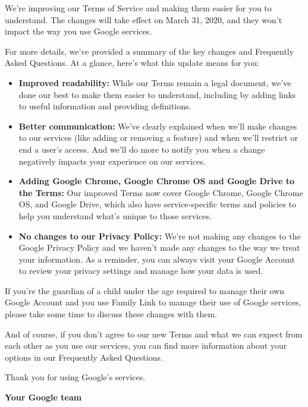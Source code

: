 \documentclass[12pt]{sigbovik-review}
\author{\textless noreply-utos@google.com\textgreater}
\begin{document}
\maketitle

We’re improving our Terms of Service and making them easier for you to
understand. The changes will take effect on March 31, 2020, and they won’t
impact the way you use Google services.

For more details, we’ve provided a summary of the key changes and Frequently
Asked Questions. At a glance, here’s what this update means for you:

\begin{itemize}
\item \textbf{Improved readability:} While our Terms remain a legal document, we’ve
done our best to make them easier to understand, including by adding
links to useful information and providing definitions.

\item \textbf{Better communication:} We’ve clearly explained when we’ll make
changes to our services (like adding or removing a feature) and when
we’ll restrict or end a user’s access. And we’ll do more to notify you
when a change negatively impacts your experience on our services.

\item \textbf{Adding Google Chrome, Google Chrome OS and Google Drive to
the Terms:} Our improved Terms now cover Google Chrome, Google
Chrome OS, and Google Drive, which also have service-specific terms
and policies to help you understand what’s unique to those services.

\item \textbf{No changes to our Privacy Policy:} We’re not making any changes to
the Google Privacy Policy and we haven't made any changes to the way
we treat your information. As a reminder, you can always visit your
Google Account to review your privacy settings and manage how your
data is used.
\end{itemize}

If you’re the guardian of a child under the age required to manage their own
Google Account and you use Family Link to manage their use of Google
services, please take some time to discuss these changes with them.

And of course, if you don’t agree to our new Terms and what we can expect from
each other as you use our services, you can find more information about your
options in our Frequently Asked Questions.

Thank you for using Google’s services.

\textbf{Your Google team}
\end{document}
